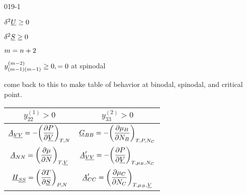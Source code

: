 \begin{mitframe}{019-1} 

  
 	\begin{listone}
        
    \item $\blthick^2 \uline{\intenergy} \geq 0$
    
    \item $\blthick^2 \uline{\entropy} \geq 0$
    
    \item $\mass=n+2$

    \item $y_{(\mass -1)(\mass -1)}^{(\mass -2)} \geq 0 , = 0$ at spinodal
        
    \item come back to this to make table of behavior at binodal, spinodal, and critical point.
    
\end{listone}	
  
\begin{longtable}{ | c | c | } 
 \hline
 	$ y_{22}^{(1)} > 0$ & $ y_{33}^{(2)} > 0$\\ \hline 
    
    $ \uline{\helmholtz}_{\uline{\vol} \uline{\vol}} = -\bigg(\dfrac{\partial\p}{\partial\uline{\vol}}\bigg)_{\Temp,\nummoles}$ & $ \uline{\gibbs}_{\exergy\exergy} = -\bigg(\dfrac{\partial\chempot_{\exergy}}{\partial\nummoles_{\exergy}}\bigg)_{\Temp,\p,\nummoles_{\conc}}$ \\ \hline 
    
    $ \uline{\helmholtz}_{\nummoles\nummoles} = \bigg(\dfrac{\partial\chempot}{\partial\nummoles}\bigg)_{\Temp,\uline{\vol}}$ & $ \uline{\helmholtz}_{\uline{\vol} \uline{\vol}}^{\prime} = -\bigg(\dfrac{\partial\p}{\partial\uline{\vol}}\bigg)_{\Temp,\chempot_{\exergy},\nummoles_{\conc}}$ \\ \hline 
    
    $\uline{\enthalpy}_{\uline{\entropy} \uline{\entropy}} = \bigg(\dfrac{\partial\Temp}{\partial\uline{\entropy}}\bigg)_{\p,\nummoles}$ & $\uline{\helmholtz}_{\conc\conc}^{\prime} = \bigg(\dfrac{\partial\chempot_{\conc}}{\partial\nummoles_{\conc}}\bigg)_{\Temp,\chempot_{\exergy},\uline{\vol}}$ \\ \hline
    

\end{longtable}
\end{mitframe}
